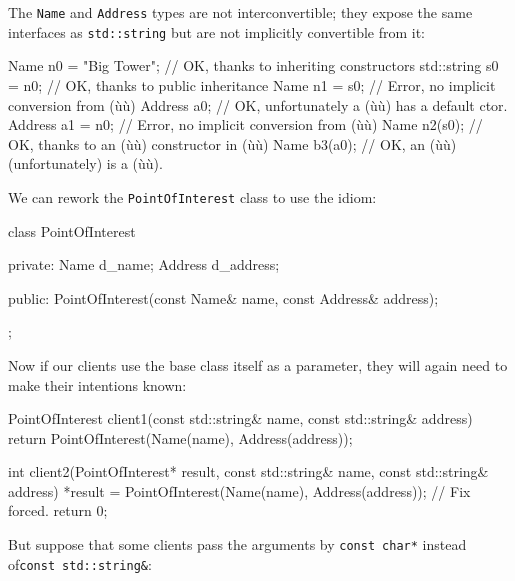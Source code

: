 \noindent The \lstinline!Name! and \lstinline!Address! types are not interconvertible; they expose the same interfaces as \lstinline!std::string! but are not
implicitly convertible from it:

\begin{emcppslisting}[emcppsbatch=e11]
Name n0 = "Big Tower";  // OK, thanks to inheriting constructors
std::string s0 = n0;    // OK, thanks to public inheritance
Name n1 = s0;           // Error, no implicit conversion from (ù{}ù)
Address a0;             // OK, unfortunately a (ù{}ù) has a default ctor.
Address a1 = n0;        // Error, no implicit conversion from (ù{}ù)
Name n2(s0);            // OK, thanks to an (ù{}ù) constructor in (ù{}ù)
Name b3(a0);            // OK, an (ù{}ù) (unfortunately) is a (ù{}ù).
\end{emcppslisting}

\noindent We can rework the \lstinline!PointOfInterest! class to use the
 idiom:

\begin{emcppslisting}[emcppsbatch=e11]
class PointOfInterest
{
private:
    Name    d_name;
    Address d_address;

public:
    PointOfInterest(const Name& name, const Address& address);
};
\end{emcppslisting}

\noindent Now if our clients use the base class itself as a parameter, they will
again need to make their intentions known:

\begin{emcppslisting}[emcppsbatch=e11]
PointOfInterest client1(const std::string& name, const std::string& address)
{
    return PointOfInterest(Name(name), Address(address));
}

int client2(PointOfInterest*   result,
            const std::string& name,
            const std::string& address)
{
   *result = PointOfInterest(Name(name), Address(address)); // Fix forced.
    return 0;
}
\end{emcppslisting}

\noindent But suppose that some clients pass the arguments by
\lstinline!const!~\lstinline!char*! instead of\linebreak[4]
\mbox{\lstinline!const!~\lstinline!std::string&!}:

